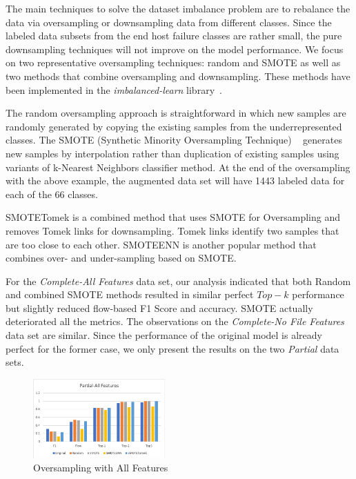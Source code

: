 The main techniques to solve the dataset imbalance problem are to rebalance the data via oversampling or downsampling data from different classes. Since the labeled data subsets from the end host failure classes are rather small, the pure downsampling techniques will not improve on the model performance. We focus on two representative oversampling techniques: random and SMOTE as well as two methods that combine oversampling and downsampling.
These methods have been implemented in the {\it imbalanced-learn} library~\cite{imbalance-learn:web}.

The random oversampling approach is straightforward in which new samples are randomly generated by copying the existing samples from the underrepresented classes. The SMOTE (Synthetic Minority Oversampling Technique) ~\cite{smote:2002} generates new samples by interpolation rather than duplication of existing samples using variants of k-Nearest Neighbors classifier method. At the end of the oversampling with the above example, the augmented data set will have 1443 labeled data for each of the 66 classes. 

SMOTETomek is a combined method that uses SMOTE for Oversampling and removes Tomek links for downsampling. Tomek links identify two samples that are too close to each other. SMOTEENN is another popular method that combines over- and under-sampling based on SMOTE.

For the  {\it Complete-All Features} data set, our analysis indicated that both Random and combined SMOTE methods resulted in similar perfect $Top-k$ performance but slightly reduced flow-based F1 Score and accuracy. SMOTE actually deteriorated all the metrics. The observations on the  {\it Complete-No File Features} data set are similar. Since the performance of the original model is already perfect for the former case, we only present the results on the two {\it Partial} data sets.


\begin{figure}[!ht]
\begin{center}
\includegraphics[width=0.45\textwidth]{./figure/partial-all-oversampling}
\end{center}
\caption{Oversampling with All Features}
\label{fig:os:all}
\end{figure}

